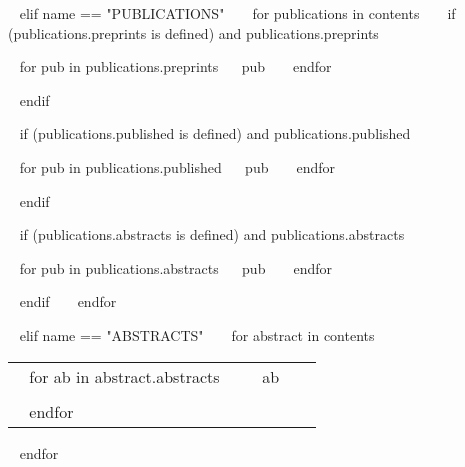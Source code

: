 \begin{minipage}{\textwidth}
%

~{ elif name == "PUBLICATIONS" }~
~{ for publications in contents }~
  ~{ if (publications.preprints is defined) and publications.preprints }~
  \begin{entrylist}[.1]
    ~{ for pub in publications.preprints}~
    \pubentry
      {~{{ pub }}~}
    ~{ endfor }~
  \end{entrylist}
  ~{ endif }~

  ~{ if (publications.published is defined) and publications.published }~
  \begin{entrylist}[.1]
    ~{ for pub in publications.published}~
    \pubentry
      {~{{ pub }}~}
    ~{ endfor }~
  \end{entrylist}
  ~{ endif }~

  ~{ if (publications.abstracts is defined) and publications.abstracts }~
  \begin{entrylist}[.1]
    ~{ for pub in publications.abstracts}~
    \pubentry
      {~{{ pub }}~}
    ~{ endfor }~
  \end{entrylist}
  ~{ endif }~
~{ endfor }~


%

~{ elif name == "ABSTRACTS" }~
~{ for abstract in contents }~
  \begin{tabular}{ p{} %
                 p{} 
                 p{}} %
  ~{ for ab in abstract.abstracts }~
  \small\textcolor{gray}{{\emph{  }}} & {~{{ ab }}~} & {\hfill \small{ }} \\ \\
  ~{ endfor }~
  \end{tabular}
~{ endfor }~

%


\end{minipage}
